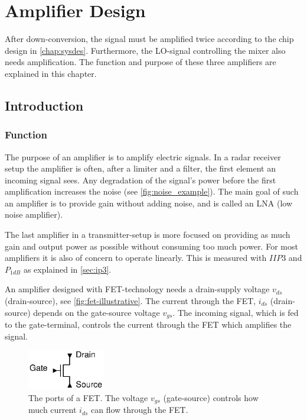 \chapter{Amplifier Design}\label{ch:amp}

	After down-conversion, the signal must be amplified twice according to the chip design in \autoref{chap:sysdes}. Furthermore, the LO-signal controlling the mixer also needs amplification. The function and purpose of these three amplifiers are explained in this chapter.
	
	\section{Introduction}
		\subsection{Function}
			The purpose of an amplifier is to amplify electric signals. In a radar receiver setup the amplifier is often, after a limiter and a filter, the first element an incoming signal sees. Any degradation of the signal's power before the first amplification increases the noise (see \autoref{fig:noise_example}). The main goal of such an amplifier is to provide gain without adding noise, and is called an LNA (low noise amplifier).
			
			The last amplifier in a transmitter-setup is more focused on providing as much gain and output power as possible without consuming too much power. For most amplifiers it is also of concern to operate linearly. This is measured with $IIP3$ and $P_{1dB}$ as explained in \autoref{sec:ip3}.
			
			An amplifier designed with FET-technology needs a drain-supply voltage $v_{ds}$ (drain-source), see \autoref{fig:fet-illustrative}. The current through the FET, $i_{ds}$ (drain-source) depends on the gate-source voltage $v_{gs}$. The incoming signal, which is fed to the gate-terminal, controls the current through the FET which amplifies the signal.
			
		\begin{figure}[hbt!]
			\centering
			\includegraphics[width=0.3\textwidth]{fig/amplifiers/fet-illustrative}
			\caption[The ports of a FET.]{The ports of a FET. The voltage $v_{gs}$ (gate-source) controls how much current $i_{ds}$ can flow through the FET.}\label{fig:fet-illustrative}
		\end{figure}
			
